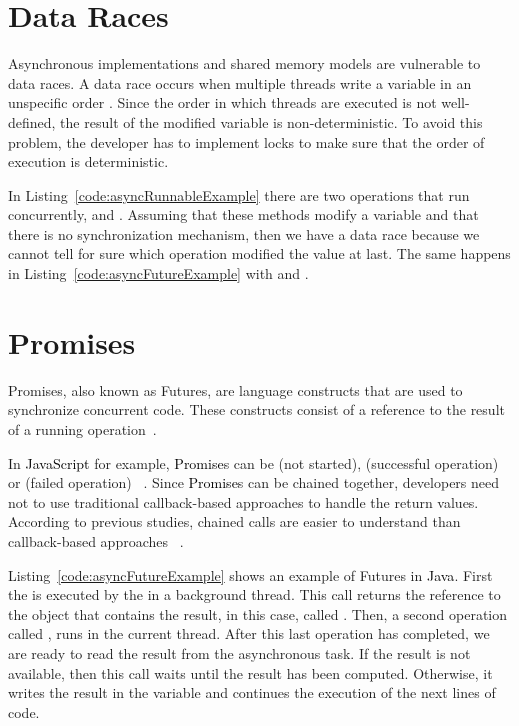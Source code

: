 \documentclass[type=bsc,accentcolor=tud9c]{tudthesis}
\newcommand{\framework}[1]{\textcolor{black}{#1}}
\begin{document}


\section{Data Races}
Asynchronous implementations and shared memory models are vulnerable to data races. A data race occurs when multiple threads write a variable in an unspecific order \cite{bookDataRaces}. Since the order in which threads are executed is not well-defined, the result of the modified variable is non-deterministic. To avoid this problem, the developer has to implement locks to make sure that the order of execution is deterministic.

In Listing~\ref{code:asyncRunnableExample} there are two operations that run concurrently,  and . Assuming that these methods modify a variable  and that there is no synchronization mechanism, then we have a data race because we cannot tell for sure which operation modified the value at last. The same happens in Listing~\ref{code:asyncFutureExample} with  and .

\section{Promises}
Promises, also known as Futures, are language constructs that are used to synchronize concurrent code. These constructs consist of a reference to the result of a running operation~\cite{promisesDef}.

In \framework{JavaScript} for example, \framework{Promise}s can be  (not started),  (successful operation) or  (failed operation) ~\cite{promises}. Since \framework{Promise}s can be chained together, developers need not to use traditional callback-based approaches to handle the return values. According to previous studies, chained calls are easier to understand than callback-based approaches ~\cite{promisesSpring}.

Listing~\ref{code:asyncFutureExample} shows an example of Futures in \framework{Java}. First the  is executed by the  in a background thread. This call returns the reference to the object that contains the result, in this case, called . Then, a second operation called , runs in the current thread. After this last operation has completed, we are ready to read the result from the asynchronous task. If the result is not available, then this call waits until the result has been computed. Otherwise, it writes the result in the variable  and continues the execution of the next lines of code.
\end{document}
